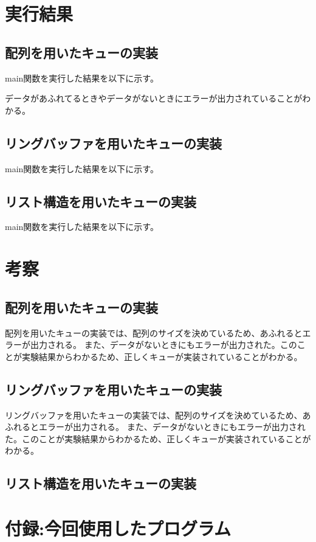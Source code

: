 \documentclass[dvipdfmx]{jsarticle}
\begin{document}
\section{実行結果}
\subsection{配列を用いたキューの実装}
main関数を実行した結果を以下に示す。

データがあふれてるときやデータがないときにエラーが出力されていることがわかる。
\subsection{リングバッファを用いたキューの実装}
main関数を実行した結果を以下に示す。


\subsection{リスト構造を用いたキューの実装}
main関数を実行した結果を以下に示す。


% 
\section{考察}
\subsection{配列を用いたキューの実装}
配列を用いたキューの実装では、配列のサイズを決めているため、あふれるとエラーが出力される。
また、データがないときにもエラーが出力された。このことが実験結果からわかるため、正しくキューが実装されていることがわかる。
\subsection{リングバッファを用いたキューの実装}
リングバッファを用いたキューの実装では、配列のサイズを決めているため、あふれるとエラーが出力される。
また、データがないときにもエラーが出力された。このことが実験結果からわかるため、正しくキューが実装されていることがわかる。

\subsection{リスト構造を用いたキューの実装}

\section{付録:今回使用したプログラム}



\end{document}

